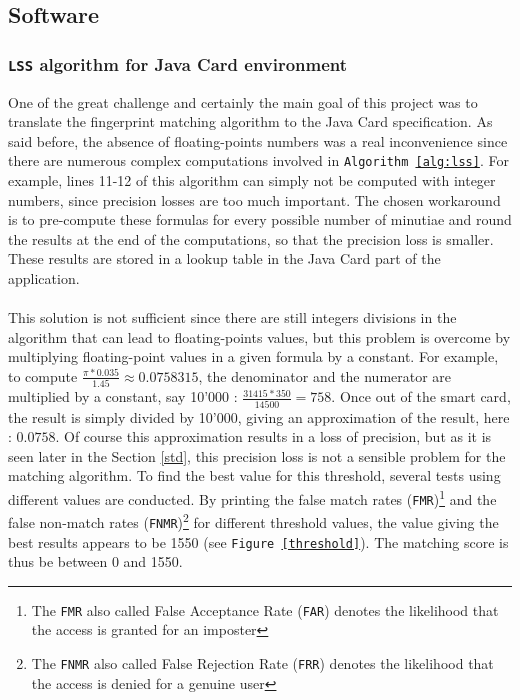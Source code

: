 \documentclass[a4paper,12pt]{article}
\begin{document}
\subsection{Software}
\subsubsection{\texttt{LSS} algorithm for Java Card environment}
\label{section:lss}
One of the great challenge and certainly the main goal of this project was to translate the fingerprint matching algorithm to the Java Card specification. As said before, the absence of floating-points numbers was a real inconvenience since there are numerous complex computations involved in \texttt{Algorithm \ref{alg:lss}}. For example, lines 11-12 of this algorithm can simply not be computed with integer numbers, since precision losses are too much important. The chosen workaround is to pre-compute these formulas for every possible number of minutiae and round the results at the end of the computations, so that the precision loss is smaller. These results are stored in a lookup table in the Java Card part of the application.\\\\
This solution is not sufficient since there are still integers divisions in the algorithm that can lead to floating-points values, but this problem is overcome by multiplying floating-point values in a given formula by a constant. For example, to compute 
$ \frac{\pi * 0.035}{1.45} \approx 0.0758315 $, the denominator and the numerator are multiplied by a constant, say 10'000 : 
$ \frac{31415 * 350}{14500} = 758$. Once out of the smart card, the result is simply divided by 10'000, giving an approximation of the result, here : $0.0758$. Of course this approximation results in a loss of precision, but as it is seen later in the Section \ref{std}, this precision loss is not a sensible problem for the matching algorithm. To find the best value for this threshold, several tests using different values are conducted. By printing the false match rates (\texttt{FMR})\footnote{The \texttt{FMR} also called {False Acceptance Rate (\texttt{FAR})} denotes the likelihood that the access is granted for an imposter} and the false non-match rates (\texttt{FNMR})\footnote{The \texttt{FNMR} also called {False Rejection Rate (\texttt{FRR})} denotes the likelihood that the access is denied for a genuine user} for different threshold values, the value giving the best results appears to be 1550 (see \texttt{Figure \ref{threshold}}). The matching score is thus be between 0 and 1550.
\end{document}
